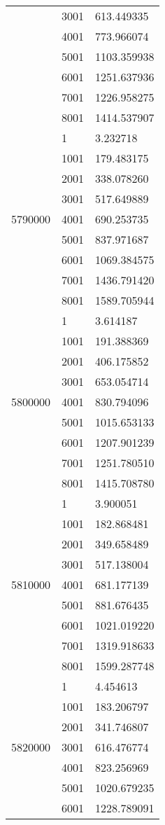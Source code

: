 \begin{table}[htb!]
\begin{tabular}{lll}
 & 3001 & 613.449335 \\
 & 4001 & 773.966074 \\
 & 5001 & 1103.359938 \\
 & 6001 & 1251.637936 \\
 & 7001 & 1226.958275 \\
 & 8001 & 1414.537907 \\
\multirow[c]{9}{*}{5790000} & 1 & 3.232718 \\
 & 1001 & 179.483175 \\
 & 2001 & 338.078260 \\
 & 3001 & 517.649889 \\
 & 4001 & 690.253735 \\
 & 5001 & 837.971687 \\
 & 6001 & 1069.384575 \\
 & 7001 & 1436.791420 \\
 & 8001 & 1589.705944 \\
\multirow[c]{9}{*}{5800000} & 1 & 3.614187 \\
 & 1001 & 191.388369 \\
 & 2001 & 406.175852 \\
 & 3001 & 653.054714 \\
 & 4001 & 830.794096 \\
 & 5001 & 1015.653133 \\
 & 6001 & 1207.901239 \\
 & 7001 & 1251.780510 \\
 & 8001 & 1415.708780 \\
\multirow[c]{9}{*}{5810000} & 1 & 3.900051 \\
 & 1001 & 182.868481 \\
 & 2001 & 349.658489 \\
 & 3001 & 517.138004 \\
 & 4001 & 681.177139 \\
 & 5001 & 881.676435 \\
 & 6001 & 1021.019220 \\
 & 7001 & 1319.918633 \\
 & 8001 & 1599.287748 \\
\multirow[c]{9}{*}{5820000} & 1 & 4.454613 \\
 & 1001 & 183.206797 \\
 & 2001 & 341.746807 \\
 & 3001 & 616.476774 \\
 & 4001 & 823.256969 \\
 & 5001 & 1020.679235 \\
 & 6001 & 1228.789091 \\

\end{tabular}
\end{table}
